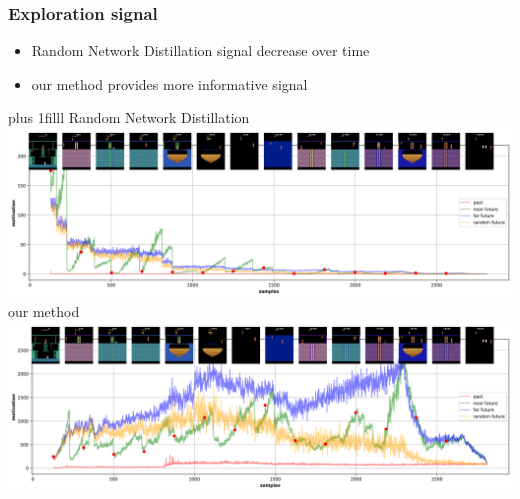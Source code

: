 \documentclass{beamer}
\begin{document}
\begin{frame}
  \frametitle{Exploration signal}
  
  \begin{itemize}
    \item Random Network Distillation signal decrease over time
    \item our method provides more informative signal
  \end{itemize} 
  
  \vskip 0pt plus 1filll 
  {\Large Random Network Distillation} \\
  \includegraphics[scale=0.2]{../results/novelty_detection/rnd_result_summary.png}
  \\
  {\Large our method} \\
  \includegraphics[scale=0.2]{../results/novelty_detection/cnd_vicreg_result_summary.png}

\end{frame}
\end{document}
